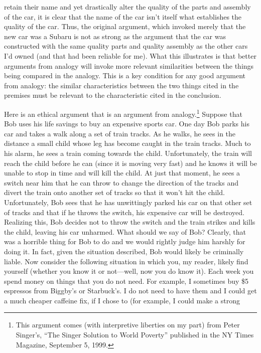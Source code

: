 retain their name and yet drastically alter the quality of the parts and assembly
of the car, it is clear that the name of the car isn't itself what establishes the
quality of the car. Thus, the original argument, which invoked merely that the
new car was a Subaru is not as strong as the argument that the car was
constructed with the same quality parts and quality assembly as the other cars
I'd owned (and that had been reliable for me). What this illustrates is that better
arguments from analogy will invoke more relevant similarities between the
things being compared in the analogy. This is a key condition for any good
argument from analogy: the similar characteristics between the two things cited
in the premises must be relevant to the characteristic cited in the conclusion.

Here is an ethical argument that is an argument from 
analogy.\footnote{This argument comes (with interpretive liberties on my part) from Peter Singer's, ``The Singer
Solution to World Poverty'' published in the NY Times Magazine, September 5, 1999.}
Suppose that
Bob uses his life savings to buy an expensive sports car. One day Bob parks his
car and takes a walk along a set of train tracks. As he walks, he sees in the
distance a small child whose leg has become caught in the train tracks. Much to
his alarm, he sees a train coming towards the child. Unfortunately, the train will
reach the child before he can (since it is moving very fast) and he knows it will be
unable to stop in time and will kill the child. At just that moment, he sees a
switch near him that he can throw to change the direction of the tracks and
divert the train onto another set of tracks so that it won't hit the child.
Unfortunately, Bob sees that he has unwittingly parked his car on that other set
of tracks and that if he throws the switch, his expensive car will be destroyed.
Realizing this, Bob decides not to throw the switch and the train strikes and kills
the child, leaving his car unharmed. What should we say of Bob? Clearly, that
was a horrible thing for Bob to do and we would rightly judge him harshly for
doing it. In fact, given the situation described, Bob would likely be criminally
liable. Now consider the following situation in which you, my reader, likely find
yourself (whether you know it or not—well, now you do know it). Each week you
spend money on things that you do not need. For example, I sometimes buy \$5
espressos from Biggby's or Starbuck's. I do not need to have them and I could
get a much cheaper caffeine fix, if I chose to (for example, I could make a strong
